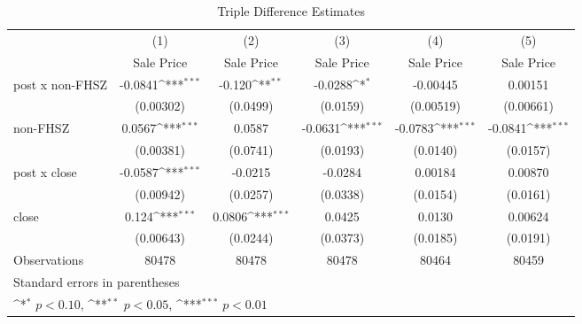\begin{table}[htbp]\centering
\def\sym#1{\ifmmode^{#1}\else\(^{#1}\)\fi}
\caption{Triple Difference Estimates\label{tabl}}
\begin{tabular}{l*{5}{c}}
\hline\hline
                    &\multicolumn{1}{c}{(1)}&\multicolumn{1}{c}{(2)}&\multicolumn{1}{c}{(3)}&\multicolumn{1}{c}{(4)}&\multicolumn{1}{c}{(5)}\\
                    &\multicolumn{1}{c}{Sale Price}&\multicolumn{1}{c}{Sale Price}&\multicolumn{1}{c}{Sale Price}&\multicolumn{1}{c}{Sale Price}&\multicolumn{1}{c}{Sale Price}\\
\hline
post x non-FHSZ     &     -0.0841\sym{***}&      -0.120\sym{**} &     -0.0288\sym{*}  &    -0.00445         &     0.00151         \\
                    &   (0.00302)         &    (0.0499)         &    (0.0159)         &   (0.00519)         &   (0.00661)         \\
[1em]
non-FHSZ            &      0.0567\sym{***}&      0.0587         &     -0.0631\sym{***}&     -0.0783\sym{***}&     -0.0841\sym{***}\\
                    &   (0.00381)         &    (0.0741)         &    (0.0193)         &    (0.0140)         &    (0.0157)         \\
[1em]
post x close        &     -0.0587\sym{***}&     -0.0215         &     -0.0284         &     0.00184         &     0.00870         \\
                    &   (0.00942)         &    (0.0257)         &    (0.0338)         &    (0.0154)         &    (0.0161)         \\
[1em]
close               &       0.124\sym{***}&      0.0806\sym{***}&      0.0425         &      0.0130         &     0.00624         \\
                    &   (0.00643)         &    (0.0244)         &    (0.0373)         &    (0.0185)         &    (0.0191)         \\
\hline
Observations        &       80478         &       80478         &       80478         &       80464         &       80459         \\
\hline\hline
\multicolumn{6}{l}{\footnotesize Standard errors in parentheses}\\
\multicolumn{6}{l}{\footnotesize \sym{*} \(p<0.10\), \sym{**} \(p<0.05\), \sym{***} \(p<0.01\)}\\
\end{tabular}
\end{table}
